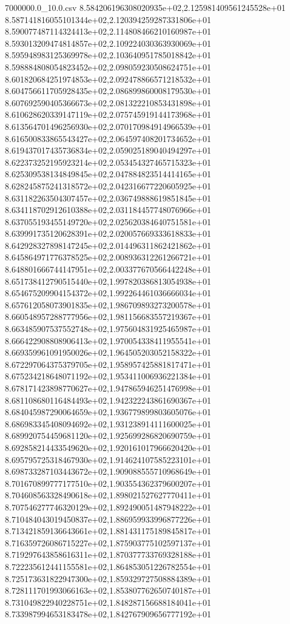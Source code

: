 \begin{filecontents*}{7000000.0_10.0.csv}
8.584206196308020935e+02,2.125981409561245528e+01
8.587141816055101344e+02,2.120394259287331806e+01
8.590077487114324413e+02,2.114808466210160987e+01
8.593013209474814857e+02,2.109224030363930069e+01
8.595948983125369978e+02,2.103640951785018842e+01
8.598884808054823452e+02,2.098059230508624751e+01
8.601820684251974853e+02,2.092478866571218532e+01
8.604756611705928435e+02,2.086899860008179530e+01
8.607692590405366673e+02,2.081322210853431898e+01
8.610628620339147119e+02,2.075745919144173968e+01
8.613564701496256930e+02,2.070170984914966539e+01
8.616500833865543427e+02,2.064597408201734652e+01
8.619437017435736834e+02,2.059025189040494297e+01
8.622373252195923214e+02,2.053454327465715323e+01
8.625309538134849845e+02,2.047884823514414165e+01
8.628245875241318572e+02,2.042316677220605925e+01
8.631182263504307457e+02,2.036749888619851845e+01
8.634118702912610388e+02,2.031184457748076966e+01
8.637055193455149720e+02,2.025620384640751581e+01
8.639991735120628391e+02,2.020057669333618833e+01
8.642928327898147245e+02,2.014496311862421862e+01
8.645864971776378525e+02,2.008936312261266721e+01
8.648801666744147951e+02,2.003377670566442248e+01
8.651738412790515440e+02,1.997820386813054938e+01
8.654675209904154372e+02,1.992264461036666034e+01
8.657612058073901835e+02,1.986709893273200578e+01
8.660548957288777956e+02,1.981156683557219367e+01
8.663485907537552748e+02,1.975604831925465987e+01
8.666422908808906413e+02,1.970054338411955541e+01
8.669359961091950026e+02,1.964505203052158322e+01
8.672297064375379705e+02,1.958957425881817471e+01
8.675234218648071192e+02,1.953411006936221384e+01
8.678171423898770627e+02,1.947865946251476998e+01
8.681108680116484493e+02,1.942322243861690367e+01
8.684045987290064659e+02,1.936779899803605076e+01
8.686983345408094692e+02,1.931238914111600025e+01
8.689920754459681120e+02,1.925699286820690759e+01
8.692858214433549620e+02,1.920161017966620420e+01
8.695795725318467930e+02,1.914624107585223101e+01
8.698733287103443672e+02,1.909088555710968649e+01
8.701670899777177510e+02,1.903554362379600207e+01
8.704608563328490618e+02,1.898021527627770411e+01
8.707546277746320129e+02,1.892490051487948222e+01
8.710484043019450837e+02,1.886959933996877226e+01
8.713421859136643661e+02,1.881431175189845817e+01
8.716359726086715227e+02,1.875903775102597137e+01
8.719297643858616311e+02,1.870377733769328188e+01
8.722235612441155581e+02,1.864853051226782554e+01
8.725173631822947300e+02,1.859329727508884389e+01
8.728111701993066163e+02,1.853807762650740187e+01
8.731049822940228751e+02,1.848287156688184041e+01
8.733987994653183478e+02,1.842767909656777192e+01

\end{filecontents*}
